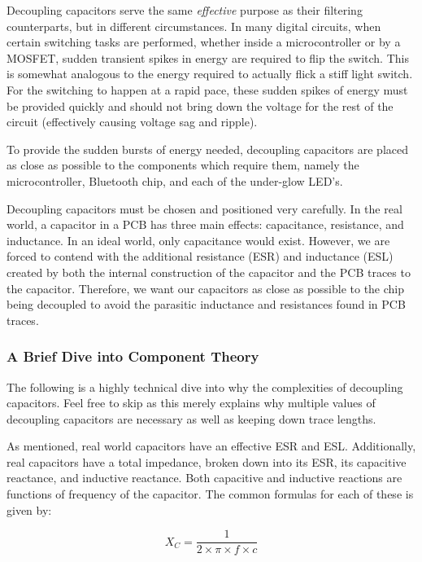 \documentclass[11pt]{article}
\begin{document}
Decoupling capacitors serve the same \emph{effective} purpose as their filtering counterparts, but in different circumstances. In many digital circuits, when certain switching tasks are performed, whether inside a microcontroller or by a MOSFET, sudden transient spikes in energy are required to flip the switch. This is somewhat analogous to the energy required to actually flick a stiff light switch. For the switching to happen at a rapid pace, these sudden spikes of energy must be provided quickly and should not bring down the voltage for the rest of the circuit (effectively causing voltage sag and ripple). 

To provide the sudden bursts of energy needed, decoupling capacitors are placed as close as possible to the components which require them, namely the microcontroller, Bluetooth chip, and each of the under-glow LED's.

Decoupling capacitors must be chosen and positioned very carefully. In the real world, a capacitor in a PCB has three main effects: capacitance, resistance, and inductance. In an ideal world, only capacitance would exist. However, we are forced to contend with the additional resistance (ESR) and inductance (ESL) created by both the internal construction of the capacitor and the PCB traces to the capacitor. Therefore, we want our capacitors as close as possible to the chip being decoupled to avoid the parasitic inductance and resistances found in PCB traces. 

\subsubsection{A Brief Dive into Component Theory}

The following is a highly technical dive into why the complexities of decoupling capacitors. Feel free to skip as this merely explains why multiple values of decoupling capacitors are necessary as well as keeping down trace lengths. 

As mentioned, real world capacitors have an effective ESR and ESL. Additionally, real capacitors have a total impedance, broken down into its ESR, its capacitive reactance, and inductive reactance. Both capacitive and inductive reactions are functions of frequency of the capacitor. The common formulas for each of these is given by:

\begin{equation}
	X_C = \frac{1}{2 \times \pi \times f \times c}	
\end{equation}
\end{document}
